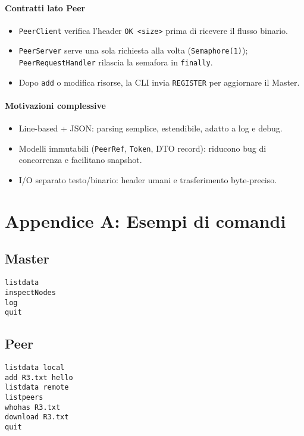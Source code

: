 \documentclass[a4paper,12pt]{article}
\begin{document}
\paragraph{Contratti lato Peer}
\begin{itemize}[nosep]
  \item \texttt{PeerClient} verifica l’header \texttt{OK <size>} prima di ricevere il flusso binario.
  \item \texttt{PeerServer} serve una sola richiesta alla volta (\texttt{Semaphore(1)}); \texttt{PeerRequestHandler} rilascia la semafora in \texttt{finally}.
  \item Dopo \texttt{add} o modifica risorse, la CLI invia \texttt{REGISTER} per aggiornare il Master.
\end{itemize}

\paragraph{Motivazioni complessive}
\begin{itemize}[nosep]
  \item Line-based + JSON: parsing semplice, estendibile, adatto a log e debug.
  \item Modelli immutabili (\texttt{PeerRef}, \texttt{Token}, DTO record): riducono bug di concorrenza e facilitano snapshot.
  \item I/O separato testo/binario: header umani e trasferimento byte-preciso.
\end{itemize}



\section{Appendice A: Esempi di comandi}
\subsection*{Master}
\begin{lstlisting}
listdata
inspectNodes
log
quit
\end{lstlisting}

\subsection*{Peer}
\begin{lstlisting}
listdata local
add R3.txt hello
listdata remote
listpeers
whohas R3.txt
download R3.txt
quit
\end{lstlisting}
\end{document}
